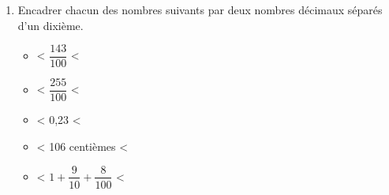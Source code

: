 \begin{changemargin}{-10mm}{-10mm}
\begin{activite}
\begin{enumerate}
\begin{spacing}{1.6}
\begin{multicols}{2}
\begin{itemize}
                        \item \makebox[0.2\linewidth]{\dotfill} < $\dfrac{143}{100}$ <                  \makebox[0.2\linewidth]{\dotfill}
                        \item \makebox[0.2\linewidth]{\dotfill} < $\dfrac{255}{100}$ <                  \makebox[0.2\linewidth]{\dotfill}
                        \item \makebox[0.2\linewidth]{\dotfill} < 0,23 <                                \makebox[0.2\linewidth]{\dotfill}
                        \item \makebox[0.2\linewidth]{\dotfill} < {\small 106 centièmes} <              \makebox[0.2\linewidth]{\dotfill}
                        \item \makebox[0.2\linewidth]{\dotfill} < $1+\dfrac{9}{10}+\dfrac{8}{100}$ <    \makebox[0.2\linewidth]{\dotfill}
                    \end{itemize}
                \end{multicols}
            \end{spacing}
            \vspace*{-3mm}
             \item Encadrer chacun des nombres suivants par deux nombres décimaux séparés d'un dixième.
             \begin{spacing}{1.6}
                \begin{multicols}{2}
                    \begin{itemize}
                        \item \makebox[0.2\linewidth]{\dotfill} < $\dfrac{143}{100}$ <               \makebox[0.2\linewidth]{\dotfill}
                        \item \makebox[0.2\linewidth]{\dotfill} < $\dfrac{255}{100}$ <               \makebox[0.2\linewidth]{\dotfill}
                        \item \makebox[0.2\linewidth]{\dotfill} < 0,23 <                             \makebox[0.2\linewidth]{\dotfill}
                        \item \makebox[0.2\linewidth]{\dotfill} < {\small 106 centièmes} <           \makebox[0.2\linewidth]{\dotfill}
                        \item \makebox[0.2\linewidth]{\dotfill} < $1+\dfrac{9}{10}+\dfrac{8}{100}$ < \makebox[0.2\linewidth]{\dotfill}
                    \end{itemize}
                \end{multicols}
            \end{spacing}

\end{enumerate}
\end{activite}
\end{changemargin}
